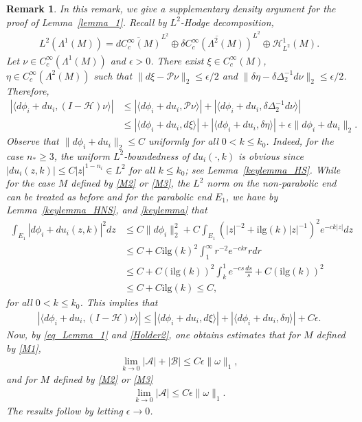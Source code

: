 \documentclass[12pt]{amsart}
\newtheorem{remark}[theorem]{Remark}
\begin{document}
\begin{remark}\label{remark_density}
In this remark, we give a supplementary density argument for the proof of Lemma~\ref{lemma_1}. Recall by $L^2$-Hodge decomposition,
\begin{align*}
    L^2(\Lambda^1(M)) = \overline{d C_c^\infty(M)}^{L^2} \oplus \overline{\delta C_c^\infty(\Lambda^2(M))}^{L^2} \oplus \mathcal{H}_{L^2}^1(M).
\end{align*}
Let $\nu\in C_c^\infty(\Lambda^1(M))$ and $\epsilon >0$. There exist $\xi \in C_c^\infty(M)$, $\eta \in C_c^\infty(\Lambda^2(M))$ such that $\|d\xi - \mathcal{P}\nu\|_2 \le \epsilon /2$ and $\|\delta \eta - \delta \Delta_2^{-1} d\nu\|_2 \le \epsilon /2$. Therefore,
\begin{align*}
|\langle d\phi_i+du_i, (I-\mathcal{H})\nu \rangle| &\le |\langle d\phi_i+du_i, \mathcal{P}\nu \rangle| + |\langle d\phi_i+du_i, \delta \Delta_2^{-1}d\nu \rangle|\\
    &\le |\langle d\phi_i+du_i, d\xi \rangle| + |\langle d\phi_i+du_i, \delta \eta \rangle| + \epsilon \|d\phi_i+du_i\|_2.
\end{align*}
Observe that $\|d\phi_i+du_i\|_2 \le C$ uniformly for all $0<k\le k_0$. Indeed, for the case $n_* \ge 3$, the uniform $L^2$-boundedness of $du_i(\cdot,k)$ is obvious since $|du_i(z,k)|\le C |z|^{1-n_i} \in L^2$ for all $k\le k_0$; see Lemma~\ref{keylemma_HS}. While for the case $M$ defined by \eqref{M2} or \eqref{M3}, the $L^2$ norm on the non-parabolic end can be treated as before and for the parabolic end $E_1$, we have by Lemma~\ref{keylemma_HNS}, and \ref{keylemma} that 
\begin{align*}
    \int_{E_1} |d\phi_i+du_i(z,k)|^2 dz &\le C \|d\phi_i\|_2^2 + C\int_{E_1} \left(|z|^{-2} + \textrm{ilg}(k) |z|^{-1}\right)^2 e^{-ck|z|} dz\\
    &\le C+ C \textrm{ilg}(k)^2 \int_1^\infty r^{-2} e^{-ckr} rdr\\
    &\le C+ C (\textrm{ilg}(k))^2 \int_{k}^1  e^{-cs} \frac{ds}{s} + C (\textrm{ilg}(k))^2 \\
     &\le C+ C \textrm{ilg}(k) \le C,
\end{align*}
for all $0<k\le k_0$. This implies that
\begin{align*}
     |\langle d\phi_i+du_i, (I-\mathcal{H})\nu \rangle| \le |\langle d\phi_i+du_i, d\xi \rangle| + |\langle d\phi_i+du_i, \delta \eta \rangle| + C\epsilon.
\end{align*}
Now, by \eqref{eq_Lemma_1} and \eqref{Holder2}, one obtains estimates that for $M$ defined by \eqref{M1},
\begin{align*}
    \lim_{k\to 0} |\mathcal{A}| + |\mathcal{B}| \le C \epsilon \|\omega\|_1,
\end{align*}
and for $M$ defined by \eqref{M2} or \eqref{M3}
\begin{align*}
    \lim_{k\to 0} |\mathcal{A}| \le C \epsilon \|\omega\|_1.
\end{align*}
The results follow by letting $\epsilon \to 0$.

\end{remark}
\end{document}
